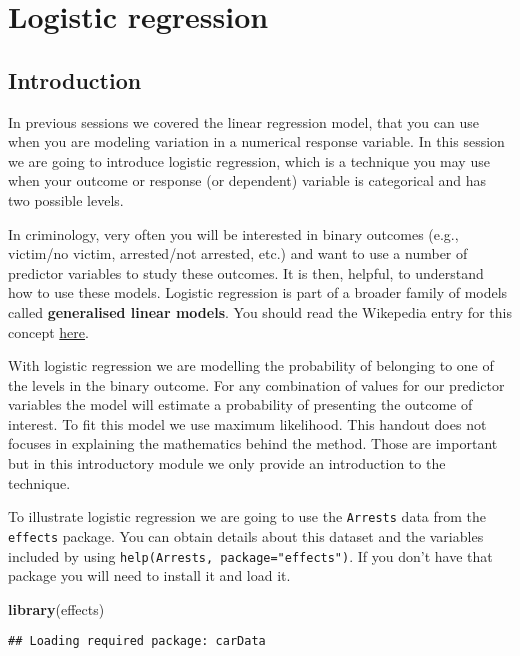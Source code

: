 \documentclass[
]{book}
\newenvironment{Shaded}{\begin{snugshade}}{\end{snugshade}}
\newcommand{\FunctionTok}[1]{\textcolor[rgb]{0.13,0.29,0.53}{\textbf{#1}}}
\newcommand{\NormalTok}[1]{#1}
\begin{document}
\chapter{Logistic regression}\label{logistic-regression}

\section{Introduction}\label{introduction-4}

In previous sessions we covered the linear regression model, that you can use when you are modeling variation in a numerical response variable. In this session we are going to introduce logistic regression, which is a technique you may use when your outcome or response (or dependent) variable is categorical and has two possible levels.

In criminology, very often you will be interested in binary outcomes (e.g., victim/no victim, arrested/not arrested, etc.) and want to use a number of predictor variables to study these outcomes. It is then, helpful, to understand how to use these models. Logistic regression is part of a broader family of models called \textbf{generalised linear models}. You should read the Wikepedia entry for this concept \href{https://en.wikipedia.org/wiki/Generalized_linear_model}{here}.

With logistic regression we are modelling the probability of belonging to one of the levels in the binary outcome. For any combination of values for our predictor variables the model will estimate a probability of presenting the outcome of interest. To fit this model we use maximum likelihood. This handout does not focuses in explaining the mathematics behind the method. Those are important but in this introductory module we only provide an introduction to the technique.

To illustrate logistic regression we are going to use the \texttt{Arrests} data from the \texttt{effects} package. You can obtain details about this dataset and the variables included by using \texttt{help(Arrests,\ package="effects")}. If you don't have that package you will need to install it and load it.

\begin{Shaded}
\begin{Highlighting}[]
\FunctionTok{library}\NormalTok{(effects)}
\end{Highlighting}
\end{Shaded}

\begin{verbatim}
## Loading required package: carData
\end{verbatim}
\end{document}
